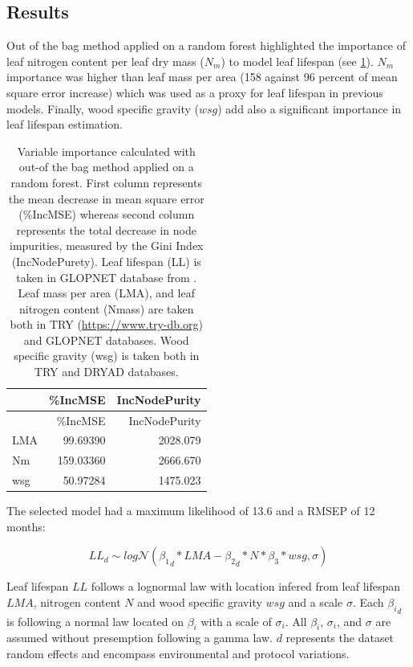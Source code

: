 \documentclass[12pt,]{article}
\theoremstyle{definition}
\theoremstyle{definition}
\theoremstyle{remark}
\begin{document}
\subsection{Results}\label{results-1}

Out of the bag method applied on a random forest highlighted the
importance of leaf nitrogen content per leaf dry mass (\(N_m\)) to model
leaf lifespan (see \ref{tab:A2OOB}). \(N_m\) importance was higher than
leaf mass per area (158 against 96 percent of mean square error
increase) which was used as a proxy for leaf lifespan in previous
models. Finally, wood specific gravity (\(wsg\)) add also a significant
importance in leaf lifespan estimation.

\begin{longtable}[]{@{}lrr@{}}
\caption{\label{tab:A2OOB}Variable importance calculated with out-of the bag
method applied on a random forest. First column represents the mean
decrease in mean square error (\%IncMSE) whereas second column
represents the total decrease in node impurities, measured by the Gini
Index (IncNodePurety). Leaf lifespan (LL) is taken in GLOPNET database
from \citet{wright_worldwide_2004}. Leaf mass per area (LMA), and leaf
nitrogen content (Nmass) are taken both in TRY
(\url{https://www.try-db.org}) and GLOPNET databases. Wood specific
gravity (wsg) is taken both in TRY and DRYAD databases.}\tabularnewline
\toprule
& \%IncMSE & IncNodePurity\tabularnewline
\midrule
\endfirsthead
\toprule
& \%IncMSE & IncNodePurity\tabularnewline
\midrule
\endhead
LMA & 99.69390 & 2028.079\tabularnewline
Nm & 159.03360 & 2666.670\tabularnewline
wsg & 50.97284 & 1475.023\tabularnewline
\bottomrule
\end{longtable}

The selected model had a maximum likelihood of 13.6 and a RMSEP of 12
months:

\begin{equation}
  LL_{d} \sim log\mathcal{N}({\beta_1}_d*LMA - {\beta_2}_d*N*\beta_3*wsg, \sigma)
  \label{eq:LL}
\end{equation}

Leaf lifespan \(LL\) follows a lognormal law with location infered from
leaf lifespan \(LMA\), nitrogen content \(N\) and wood specific gravity
\(wsg\) and a scale \(\sigma\). Each \({\beta_i}_d\) is following a
normal law located on \(\beta_i\) with a scale of \(\sigma_i\). All
\(\beta_i\), \(\sigma_i\), and \(\sigma\) are assumed without
presemption following a gamma law. \(d\) represents the dataset random
effects and encompass environmental and protocol variations.
\end{document}
